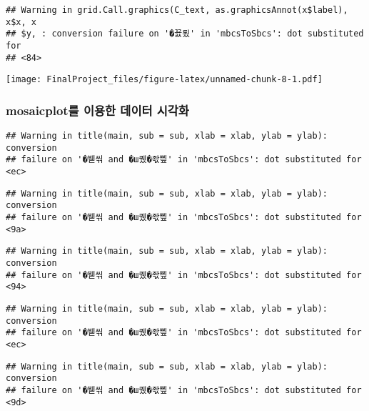 \documentclass[]{article}
\newenvironment{Shaded}{\begin{snugshade}}{\end{snugshade}}
\newcommand{\KeywordTok}[1]{\textcolor[rgb]{0.13,0.29,0.53}{\textbf{#1}}}
\newcommand{\DataTypeTok}[1]{\textcolor[rgb]{0.13,0.29,0.53}{#1}}
\newcommand{\StringTok}[1]{\textcolor[rgb]{0.31,0.60,0.02}{#1}}
\newcommand{\OtherTok}[1]{\textcolor[rgb]{0.56,0.35,0.01}{#1}}
\newcommand{\OperatorTok}[1]{\textcolor[rgb]{0.81,0.36,0.00}{\textbf{#1}}}
\newcommand{\NormalTok}[1]{#1}
\begin{document}
\begin{verbatim}
## Warning in grid.Call.graphics(C_text, as.graphicsAnnot(x$label), x$x, x
## $y, : conversion failure on '�꾨룄' in 'mbcsToSbcs': dot substituted for
## <84>
\end{verbatim}

\texttt{[image: FinalProject\_files/figure-latex/unnamed-chunk-8-1.pdf]}

\subsubsection{mosaicplot를 이용한 데이터 시각화}\label{mosaicplot---}

\begin{Shaded}
\end{Shaded}

\begin{verbatim}
## Warning in title(main, sub = sub, xlab = xlab, ylab = ylab): conversion
## failure on '�붿씪 and �ш퀬�좏삎' in 'mbcsToSbcs': dot substituted for <ec>
\end{verbatim}

\begin{verbatim}
## Warning in title(main, sub = sub, xlab = xlab, ylab = ylab): conversion
## failure on '�붿씪 and �ш퀬�좏삎' in 'mbcsToSbcs': dot substituted for <9a>
\end{verbatim}

\begin{verbatim}
## Warning in title(main, sub = sub, xlab = xlab, ylab = ylab): conversion
## failure on '�붿씪 and �ш퀬�좏삎' in 'mbcsToSbcs': dot substituted for <94>
\end{verbatim}

\begin{verbatim}
## Warning in title(main, sub = sub, xlab = xlab, ylab = ylab): conversion
## failure on '�붿씪 and �ш퀬�좏삎' in 'mbcsToSbcs': dot substituted for <ec>
\end{verbatim}

\begin{verbatim}
## Warning in title(main, sub = sub, xlab = xlab, ylab = ylab): conversion
## failure on '�붿씪 and �ш퀬�좏삎' in 'mbcsToSbcs': dot substituted for <9d>
\end{verbatim}
\end{document}
